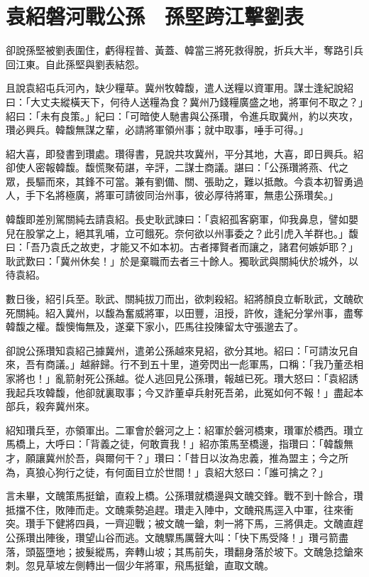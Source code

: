 
\chapter{袁紹磐河戰公孫　孫堅跨江擊劉表}

卻說孫堅被劉表圍住，虧得程普、黃蓋、韓當三將死救得脫，折兵大半，奪路引兵回江東。自此孫堅與劉表結怨。

且說袁紹屯兵河內，缺少糧草。冀州牧韓馥，遣人送糧以資軍用。謀士逢紀說紹曰：「大丈夫縱橫天下，何待人送糧為食？冀州乃錢糧廣盛之地，將軍何不取之？」紹曰：「未有良策。」紀曰：「可暗使人馳書與公孫瓚，令進兵取冀州，約以夾攻，瓚必興兵。韓馥無謀之輩，必請將軍領州事；就中取事，唾手可得。」

紹大喜，即發書到瓚處。瓚得書，見說共攻冀州，平分其地，大喜，即日興兵。紹卻使人密報韓馥。馥慌聚荀諶，辛評，二謀士商議。諶曰：「公孫瓚將燕、代之眾，長驅而來，其鋒不可當。兼有劉備、關、張助之，難以抵敵。今袁本初智勇過人，手下名將極廣，將軍可請彼同治州事，彼必厚待將軍，無患公孫瓚矣。」

韓馥即差別駕關純去請袁紹。長史耿武諫曰：「袁紹孤客窮軍，仰我鼻息，譬如嬰兒在股掌之上，絕其乳哺，立可餓死。奈何欲以州事委之？此引虎入羊群也。」馥曰：「吾乃袁氏之故吏，才能又不如本初。古者擇賢者而讓之，諸君何嫉妒耶？」耿武歎曰：「冀州休矣！」於是棄職而去者三十餘人。獨耿武與關純伏於城外，以待袁紹。

數日後，紹引兵至。耿武、關純拔刀而出，欲刺殺紹。紹將顏良立斬耿武，文醜砍死關純。紹入冀州，以馥為奮威將軍，以田豐，沮授，許攸，逢紀分掌州事，盡奪韓馥之權。馥懊悔無及，遂棄下家小，匹馬往投陳留太守張邈去了。

卻說公孫瓚知袁紹己據冀州，遣弟公孫越來見紹，欲分其地。紹曰：「可請汝兄自來，吾有商議。」越辭歸。行不到五十里，道旁閃出一彪軍馬，口稱：「我乃董丞相家將也！」亂箭射死公孫越。從人逃回見公孫瓚，報越已死。瓚大怒曰：「袁紹誘我起兵攻韓馥，他卻就裏取事；今又詐董卓兵射死吾弟，此冤如何不報！」盡起本部兵，殺奔冀州來。

紹知瓚兵至，亦領軍出。二軍會於磐河之上：紹軍於磐河橋東，瓚軍於橋西。瓚立馬橋上，大呼曰：「背義之徒，何敢賣我！」紹亦策馬至橋邊，指瓚曰：「韓馥無才，願讓冀州於吾，與爾何干？」瓚曰：「昔日以汝為忠義，推為盟主；今之所為，真狼心狗行之徒，有何面目立於世間！」袁紹大怒曰：「誰可擒之？」

言未畢，文醜策馬挺鎗，直殺上橋。公孫瓚就橋邊與文醜交鋒。戰不到十餘合，瓚抵擋不住，敗陣而走。文醜乘勢追趕。瓚走入陣中，文醜飛馬逕入中軍，往來衝突。瓚手下健將四員，一齊迎戰；被文醜一鎗，刺一將下馬，三將俱走。文醜直趕公孫瓚出陣後，瓚望山谷而逃。文醜驟馬厲聲大叫：「快下馬受降！」瓚弓箭盡落，頭盔墮地；披髮縱馬，奔轉山坡；其馬前失，瓚翻身落於坡下。文醜急捻鎗來刺。忽見草坡左側轉出一個少年將軍，飛馬挺鎗，直取文醜。

